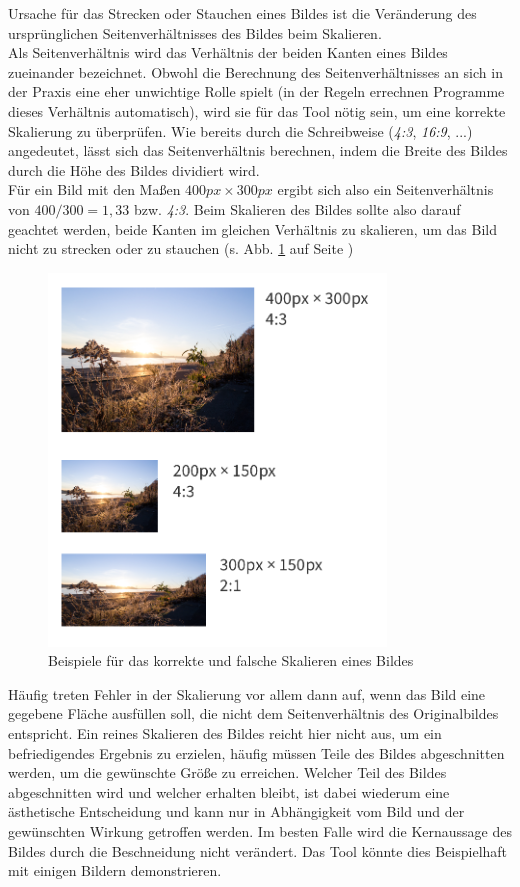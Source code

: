 Ursache für das Strecken oder Stauchen eines Bildes ist die Veränderung des ursprünglichen Seitenverhältnisses des Bildes beim Skalieren. \\
Als Seitenverhältnis wird das Verhältnis der beiden Kanten eines Bildes zueinander bezeichnet. Obwohl die Berechnung des Seitenverhältnisses an sich in der Praxis eine eher unwichtige Rolle spielt (in der Regeln errechnen Programme dieses Verhältnis automatisch), wird sie für das Tool nötig sein, um eine korrekte Skalierung zu überprüfen.
Wie bereits durch die Schreibweise (\textit{4:3}, \textit{16:9}, ...)  angedeutet, lässt sich das Seitenverhältnis berechnen, indem die Breite des Bildes durch die Höhe des Bildes dividiert wird. \\
Für ein Bild mit den Maßen $400px \times 300px$ ergibt sich also ein Seitenverhältnis von \(400 / 300 = 1,33\) bzw. \textit{4:3}.
Beim Skalieren des Bildes sollte also darauf geachtet werden, beide Kanten im gleichen Verhältnis zu skalieren, um das Bild nicht zu strecken oder zu stauchen (s. Abb. \ref{fig:scaling} auf Seite \pageref{fig:scaling})

\begin{figure}[h]
    \centering
    \includegraphics[width=0.8\textwidth]{images/scaling.png}
    \caption{Beispiele für das korrekte und falsche Skalieren eines Bildes}
    \label{fig:scaling}
\end{figure}

Häufig treten Fehler in der Skalierung vor allem dann auf, wenn das Bild eine gegebene Fläche ausfüllen soll, die nicht dem Seitenverhältnis des Originalbildes entspricht.
Ein reines Skalieren des Bildes reicht hier nicht aus, um ein befriedigendes Ergebnis zu erzielen, häufig müssen Teile des Bildes abgeschnitten werden, um die gewünschte Größe zu erreichen.
Welcher Teil des Bildes abgeschnitten wird und welcher erhalten bleibt, ist dabei wiederum eine ästhetische Entscheidung und kann nur in Abhängigkeit vom Bild und der gewünschten Wirkung getroffen werden. Im besten Falle wird die Kernaussage des Bildes durch die Beschneidung nicht verändert. Das Tool könnte dies Beispielhaft mit einigen Bildern demonstrieren.

